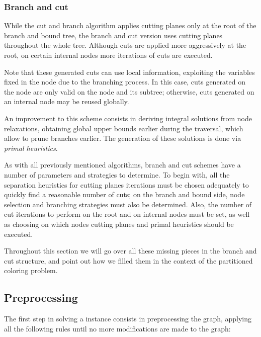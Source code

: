 \subsubsection*{Branch and cut}

While the cut and branch algorithm applies cutting planes only at the root of the branch and bound tree, the branch and cut version uses cutting planes throughout the whole tree. Although cuts are applied more aggressively at the root, on certain internal nodes more iterations of cuts are executed. 

Note that these generated cuts can use local information, exploiting the variables fixed in the node due to the branching process. In this case, cuts generated on the node are only valid on the node and its subtree; otherwise, cuts generated on an internal node may be reused globally.

An improvement to this scheme consists in deriving integral solutions from node relaxations, obtaining global upper bounds earlier during the traversal, which allow to prune branches earlier. The generation of these solutions is done via \textit{primal heuristics}.

As with all previously mentioned algorithms, branch and cut schemes have a number of parameters and strategies to determine. To begin with, all the separation heuristics for cutting planes iterations must be chosen adequately to quickly find a reasonable number of cuts; on the branch and bound side, node selection and branching strategies must also be determined. Also, the number of cut iterations to perform on the root and on internal nodes must be set, as well as choosing on which nodes cutting planes and primal heuristics should be executed.

Throughout this section we will go over all these missing pieces in the branch and cut structure, and point out how we filled them in the context of the partitioned coloring problem.

\subsection{Preprocessing}

The first step in solving a \PCP{} instance consists in preprocessing the graph, applying all the following rules until no more modifications are made to the graph:

